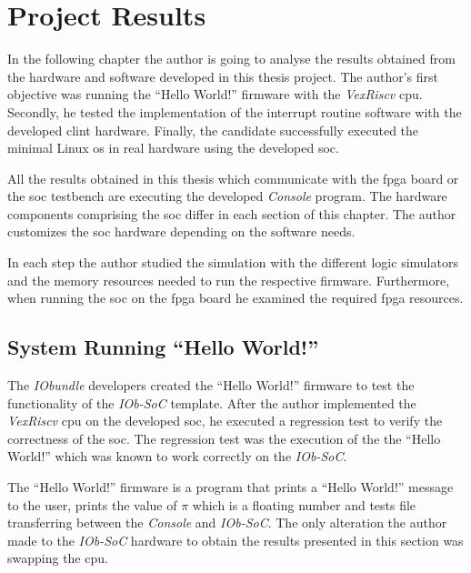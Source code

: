 \chapter{Project Results}
\label{chapter:project_results}
In the following chapter the author is going to analyse the results obtained from the hardware and software developed in this thesis project. The author's first objective was running the \enquote{Hello World!} firmware with the \textit{VexRiscv} \acrshort{cpu}. Secondly, he tested the implementation of the interrupt routine software with the developed \acrshort{clint} hardware. Finally, the candidate successfully executed the minimal Linux \acrshort{os} in real hardware using the developed \acrlong{soc}.

All the results obtained in this thesis which communicate with the \acrshort{fpga} board or the \acrlong{soc} testbench are executing the developed \textit{Console} program. The hardware components comprising the \acrshort{soc} differ in each section of this chapter. The author customizes the \acrlong{soc} hardware depending on the software needs. 

In each step the author studied the simulation with the different logic simulators and the memory resources needed to run the respective firmware. Furthermore, when running the \acrshort{soc} on the \acrshort{fpga} board he examined the required \acrshort{fpga} resources.

\section{System Running \enquote{Hello World!}}
\label{section:hello_world}
The \textit{IObundle} developers created the \enquote{Hello World!} firmware to test the functionality of the \textit{IOb-SoC} template. After the author implemented the \textit{VexRiscv} \acrshort{cpu} on the developed \acrlong{soc}, he executed a regression test to verify the correctness of the \acrlong{soc}. The regression test was the execution of the the \enquote{Hello World!} which was known to work correctly on the \textit{IOb-SoC}.

The \enquote{Hello World!} firmware is a program that prints a \enquote{Hello World!} message to the user, prints the value of $\pi$ which is a floating number and tests file transferring between the \textit{Console} and \textit{IOb-SoC}. The only alteration the author made to the \textit{IOb-SoC} hardware to obtain the results presented in this section was swapping the \acrshort{cpu}.

